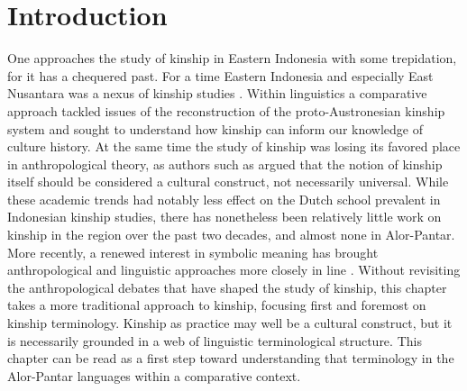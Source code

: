 
 
\section{Introduction}\label{sec:5:1}


\hypertarget{Toc376958238}{}
 

One approaches the study of kinship in Eastern Indonesia with some trepidation, for it has a chequered past. For a time Eastern Indonesia and especially East Nusantara was a nexus of kinship studies \citep[see][]{Fox1980,VanWouden1968}. Within linguistics a comparative approach tackled issues of the reconstruction of the proto-Austronesian kinship system and sought to understand how kinship can inform our knowledge of culture history. At the same time the study of kinship was losing its favored place in anthropological theory, as authors such as \citet{Schneider1984} argued that the notion of kinship itself should be considered a cultural construct, not necessarily universal. While these academic trends had notably less effect on the Dutch school prevalent in Indonesian kinship studies, there has nonetheless been relatively little work on kinship in the region over the past two decades, and almost none in Alor-Pantar. More recently, a renewed interest in symbolic meaning has brought anthropological and linguistic approaches more closely in line \citep[see][]{Schweitzer2000}. Without revisiting the anthropological debates that have shaped the study of kinship, this chapter takes a more traditional approach to kinship, focusing first and foremost on kinship terminology. Kinship as practice may well be a cultural construct, but it is necessarily grounded in a web of linguistic terminological structure. This chapter can be read as a first step toward understanding that terminology in the Alor-Pantar languages within a comparative context.

